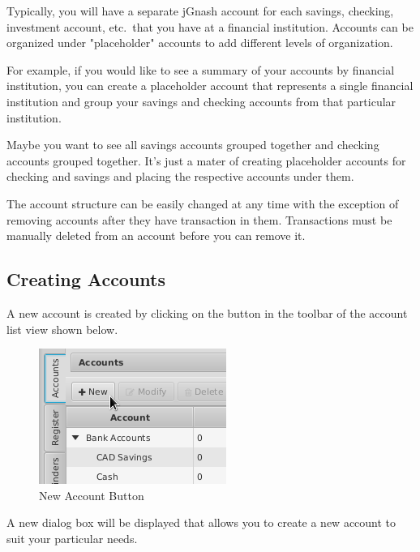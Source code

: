\documentclass[letterpaper,12pt]{book}
\begin{document}
    Typically, you will have a separate jGnash account for each savings, checking, investment account, etc.\
    that you have at a financial institution.
    Accounts can be organized under "placeholder" accounts to add different levels of organization.

    For example, if you would like to see a summary of your accounts by financial institution, you can create a placeholder
    account that represents a single financial institution and group your savings and checking accounts from that particular
    institution.

    Maybe you want to see all savings accounts grouped together and checking accounts grouped together.
    It's just a mater of creating placeholder accounts for checking and savings and placing the respective accounts under them.

    The account structure can be easily changed at any time with the exception of removing accounts after they have
    transaction in them.
    Transactions must be manually deleted from an account before you can remove it.

    \subsection{Creating Accounts}
    \label{subsec:creatingAccounts}
    A new account is created by clicking on the  button in the toolbar of the account list view shown below.

    \begin{figure}[h]
        \caption{New Account Button}
        \includegraphics[width=0.4\linewidth]{images/new-account}
    \end{figure}

    A new dialog box will be displayed that allows you to create a new account to suit your particular needs.
\end{document}
